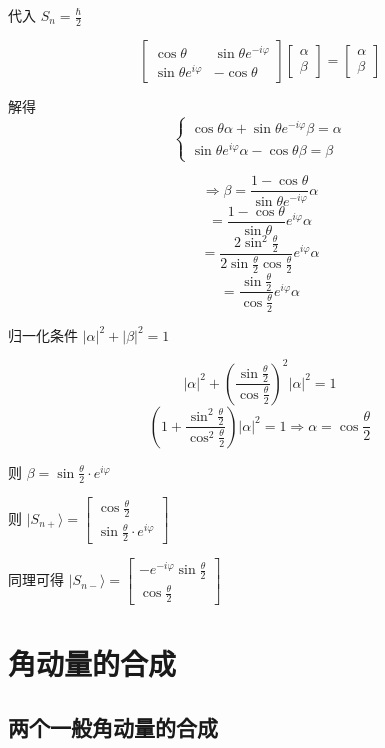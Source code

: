 \documentclass[lang=cn,10pt]{elegantbook}
\begin{document}
代入 $S_n = \frac{\hbar}{2}$

\[
\begin{bmatrix} \cos\theta & \sin\theta e^{-i\varphi} \\ \sin\theta e^{i\varphi} & -\cos\theta \end{bmatrix} \begin{bmatrix} \alpha \\ \beta \end{bmatrix} = \begin{bmatrix} \alpha \\ \beta \end{bmatrix}
\]

解得
\[
\begin{cases}
	\cos\theta \alpha + \sin\theta e^{-i\varphi} \beta = \alpha \\
	\sin\theta e^{i\varphi} \alpha - \cos\theta \beta = \beta
\end{cases}
\]

\[
\Rightarrow \beta = \frac{1 - \cos\theta}{\sin\theta e^{-i\varphi}} \alpha
\]
\[
= \frac{1 - \cos\theta}{\sin\theta} e^{i\varphi} \alpha
\]
\[
= \frac{2 \sin^2 \frac{\theta}{2}}{2 \sin \frac{\theta}{2} \cos \frac{\theta}{2}} e^{i\varphi} \alpha
\]
\[
= \frac{\sin \frac{\theta}{2}}{\cos \frac{\theta}{2}} e^{i\varphi} \alpha
\]

归一化条件 $|\alpha|^2 + |\beta|^2 = 1$

\[
|\alpha|^2 + \left(\frac{\sin \frac{\theta}{2}}{\cos \frac{\theta}{2}}\right)^2 |\alpha|^2 = 1
\]
\[
\left(1 + \frac{\sin^2 \frac{\theta}{2}}{\cos^2 \frac{\theta}{2}}\right) |\alpha|^2 = 1 \Rightarrow \alpha = \cos \frac{\theta}{2}
\]

则 $\beta = \sin \frac{\theta}{2} \cdot e^{i\varphi}$

则 $|S_{n+}\rangle = \begin{bmatrix} \cos \frac{\theta}{2} \\ \sin \frac{\theta}{2} \cdot e^{i\varphi} \end{bmatrix}$

同理可得 $|S_{n-}\rangle = \begin{bmatrix} -e^{-i\varphi}\sin \frac{\theta}{2} \\ \cos \frac{\theta}{2} \end{bmatrix}$
\section{角动量的合成}
\subsection{两个一般角动量的合成}
\end{document}

